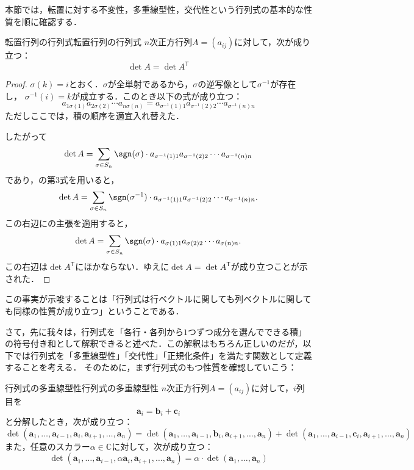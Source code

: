 本節では，転置に対する不変性，多重線型性，交代性という行列式の基本的な性質を順に確認する．


\begin{prop}{転置行列の行列式}{転置行列の行列式}
  $n$次正方行列$A = (a_{ij})$に対して，次が成り立つ：
  \[
  \det A = \det A^\mathsf{T} 
  \]
\end{prop}

\begin{leftbar}
\begin{proof}
 $\sigma (k) = i$とおく．$\sigma$が全単射であるから，$\sigma$の逆写像として$\sigma ^{-1}$が存在し，
 $\sigma ^{-1} (i)=k$が成立する．このとき以下の式が成り立つ：
 \[
 a_{1\sigma(1)} a_{2\sigma(2)} \dotsm a_{n\sigma(n)} =  a_{\sigma^{-1}(1)1} a_{\sigma^{-1}(2)2} \dotsm a_{\sigma^{-1}(n)n}
 \]
 ただしここでは，積の順序を適宜入れ替えた．

 したがって
 \[
  \det A = \sum_{\sigma \in S_n} \sgn(\sigma) \cdot a_{\sigma^{-1}(1)1} a_{\sigma^{-1}(2)2} \dotsm a_{\sigma^{-1}(n)n}
\]
であり，の第3式を用いると，
\[
\det A = \sum_{\sigma \in S_n} \sgn(\sigma^{-1}) \cdot a_{\sigma^{-1}(1)1} a_{\sigma^{-1}(2)2} \dotsm a_{\sigma^{-1}(n)n}.
\]
この右辺にの主張を適用すると，
\[
\det A = \sum_{\sigma \in S_n} \sgn (\sigma ) \cdot a_{\sigma(1)1} a_{\sigma(2)2} \dotsm a_{\sigma(n)n}.
\]
この右辺は$\det A^\mathsf{T}$にほかならない．ゆえに$\det A = \det A^\mathsf{T}$が成り立つことが示された．
\end{proof}
\end{leftbar}

この事実が示唆することは「行列式は行ベクトルに関しても列ベクトルに関しても同様の性質が成り立つ」ということである．



さて，先に我々は，行列式を「各行・各列から$1$つずつ成分を選んでできる積」の符号付き和として解釈できると述べた．この解釈はもちろん正しいのだが，以下では行列式を「多重線型性」「交代性」「正規化条件」を満たす関数として定義することを考える．
そのために，まず行列式のもつ性質を確認していこう：

\begin{prop}{行列式の多重線型性}{行列式の多重線型性}
  $n$次正方行列$A = (a_{ij})$に対して，$i$列目を
  \[
  \bm{a}_i = \bm{b}_i + \bm{c}_i
  \]
  と分解したとき，次が成り立つ：
  \[
  \det(\bm{a}_1, \dots, \bm{a}_{i-1}, \bm{a}_i, \bm{a}_{i+1}, \dots, \bm{a}_n) 
  = \det(\bm{a}_1, \dots, \bm{a}_{i-1}, \bm{b}_i, \bm{a}_{i+1}, \dots, \bm{a}_n) 
  + \det(\bm{a}_1, \dots, \bm{a}_{i-1}, \bm{c}_i, \bm{a}_{i+1}, \dots, \bm{a}_n)
  \]
  また，任意のスカラー$\alpha \in \mathbb{C}$に対して，次が成り立つ：
  \[
  \det(\bm{a}_1, \dots, \bm{a}_{i-1}, \alpha \bm{a}_i, \bm{a}_{i+1}, \dots, \bm{a}_n) 
  = \alpha \cdot \det(\bm{a}_1, \dots, \bm{a}_n)
  \]
\end{prop}

